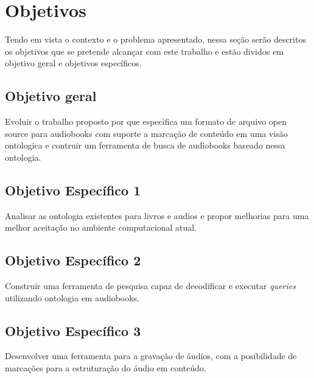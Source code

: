 \chapter{Objetivos}\label{cap2}

Tendo em vista o contexto e o problema apresentado, nessa seção serão descritos os objetivos que se pretende alcançar com este trabalho e estão dividos em objetivo geral e objetivos específicos.

\section{Objetivo geral}

Evoluir o trabalho proposto por \cite{herbert} que especifica um formato de arquivo open source para audiobooks com suporte a marcação de conteúdo em uma visão ontologica e contruir um ferramenta de busca de audiobooks baseado nessa ontologia.

\section{Objetivo Específico 1}

Analisar as ontologia existentes para livros e audios e propor melhorias para uma melhor aceitação no ambiente computacional atual.

\section{Objetivo Específico 2}

Construir uma ferramenta de pesquisa capaz de decodificar e executar \textit{queries} utilizando ontologia em audiobooks.

\section{Objetivo Específico 3}

Desenvolver uma ferramenta para a gravação de áudios, com a posibilidade de marcações para a estruturação do áudio em conteúdo.




 





